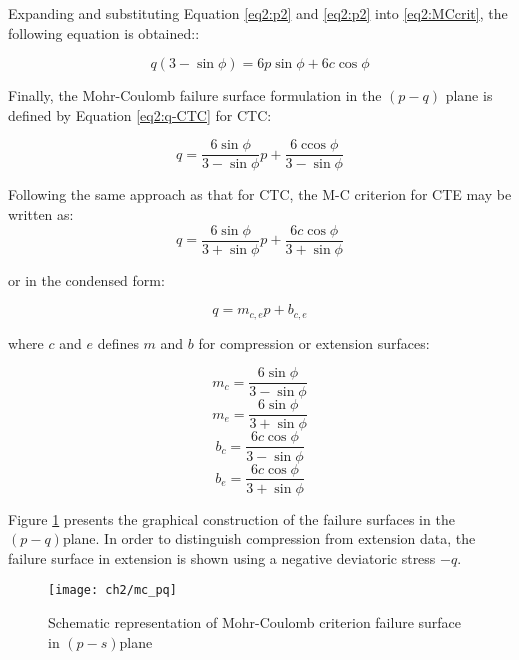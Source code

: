 Expanding and substituting Equation \ref{eq2:p2} and \ref{eq2:p2} into \ref{eq2:MCcrit}, the following equation is obtained:: 

\begin{equation}
    q(3-\sin \phi) = 6p \sin \phi + 6 c\cos \phi
\end{equation}

Finally, the Mohr-Coulomb failure surface formulation in the $(p-q)$ plane is defined by Equation \ref{eq2:q-CTC} for CTC:

\begin{equation}\label{eq2:q-CTC}
    q=\frac{6 \sin \phi}{3-\sin \phi} p+\frac{6 \operatorname{ccos} \phi}{3-\sin \phi} 
\end{equation}

Following the same approach as that for CTC, the M-C criterion for CTE may be written as:
\begin{equation}\label{eq2:q-CTE}
    q=\frac{6 \sin \phi}{3+\sin \phi} p+\frac{6 c \cos \phi}{3+\sin \phi}
\end{equation}

or in the condensed form: 

\begin{equation}\label{MC_q}
    q = m_{c,e} p + b_{c,e}
\end{equation}

where $c$ and $e$  defines $m$ and $b$ for compression or extension surfaces:

\begin{equation}\label{eq2:MC_mc_q}
    m_c=\frac{6 \sin \phi}{3-\sin \phi} 
\end{equation}
\begin{equation}\label{eq2:MC_me_q}
    m_e=\frac{6 \sin \phi}{3+\sin \phi} 
\end{equation}
\begin{equation}\label{eq2:MC_bc_q}
    b_c=\frac{6 c \cos \phi}{3-\sin \phi}
\end{equation}
\begin{equation}\label{eq2:MC_be_q}
    b_e=\frac{6 c \cos \phi}{3+\sin \phi}
\end{equation}

Figure \ref{fig2:mc_pq} presents the graphical construction of the failure surfaces in the  $(p-q)$plane. In order to distinguish compression from extension data, the failure surface in extension is shown using a negative deviatoric stress $-q$. 

\begin{figure}[tb]
    \centering
    \texttt{[image: ch2/mc\_pq]}
    \caption{Schematic representation of Mohr-Coulomb criterion failure surface in  $(p-s)$plane}
    \label{fig2:mc_pq}
\end{figure} 

